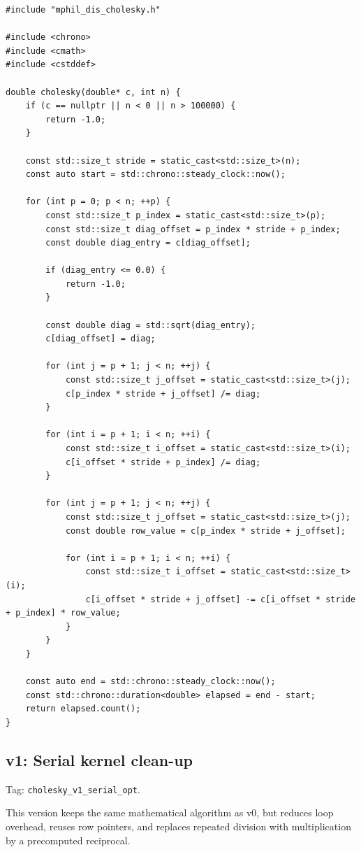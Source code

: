 \begin{lstlisting}[style=appendixcode]
#include "mphil_dis_cholesky.h"

#include <chrono>
#include <cmath>
#include <cstddef>

double cholesky(double* c, int n) {
    if (c == nullptr || n < 0 || n > 100000) {
        return -1.0;
    }

    const std::size_t stride = static_cast<std::size_t>(n);
    const auto start = std::chrono::steady_clock::now();

    for (int p = 0; p < n; ++p) {
        const std::size_t p_index = static_cast<std::size_t>(p);
        const std::size_t diag_offset = p_index * stride + p_index;
        const double diag_entry = c[diag_offset];

        if (diag_entry <= 0.0) {
            return -1.0;
        }

        const double diag = std::sqrt(diag_entry);
        c[diag_offset] = diag;

        for (int j = p + 1; j < n; ++j) {
            const std::size_t j_offset = static_cast<std::size_t>(j);
            c[p_index * stride + j_offset] /= diag;
        }

        for (int i = p + 1; i < n; ++i) {
            const std::size_t i_offset = static_cast<std::size_t>(i);
            c[i_offset * stride + p_index] /= diag;
        }

        for (int j = p + 1; j < n; ++j) {
            const std::size_t j_offset = static_cast<std::size_t>(j);
            const double row_value = c[p_index * stride + j_offset];

            for (int i = p + 1; i < n; ++i) {
                const std::size_t i_offset = static_cast<std::size_t>(i);
                c[i_offset * stride + j_offset] -= c[i_offset * stride + p_index] * row_value;
            }
        }
    }

    const auto end = std::chrono::steady_clock::now();
    const std::chrono::duration<double> elapsed = end - start;
    return elapsed.count();
}
\end{lstlisting}

\subsection{v1: Serial kernel clean-up}

Tag: \texttt{cholesky\_v1\_serial\_opt}.

This version keeps the same mathematical algorithm as v0, but reduces loop overhead, reuses row pointers, and replaces repeated division with multiplication by a precomputed reciprocal.

